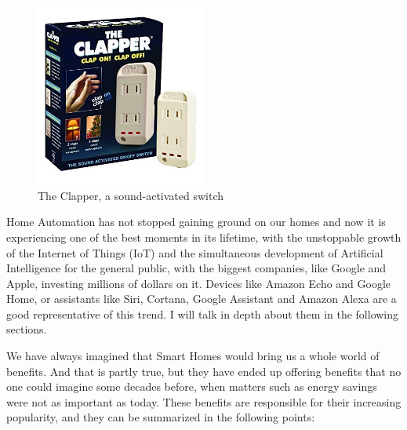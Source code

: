 \begin{figure}
	\centering
	\includegraphics[width=0.5\textwidth]{images/Chapter_02/the-clapper.jpg}
	\caption{The Clapper, a sound-activated switch}
	\label{fig:the-clapper}
\end{figure}

Home Automation has not stopped gaining ground on our homes and now it is experiencing one of the best moments
in its lifetime, with the unstoppable growth of the Internet of Things (IoT) and the simultaneous development of Artificial 
Intelligence for the general public, with the biggest companies, like Google and Apple, investing millions of dollars on it.
Devices like Amazon Echo and Google Home, or assistants like Siri, Cortana, Google Assistant and Amazon Alexa are a 
good representative of this trend. I will talk in depth about them in the following sections.

We have always imagined that Smart Homes would bring us a whole world of benefits. And that is partly true, but
they have ended up offering benefits that no one could imagine some decades before, when matters such as energy
savings were not as important as today. These benefits are responsible for their increasing popularity, and they can be 
summarized in the following points:

